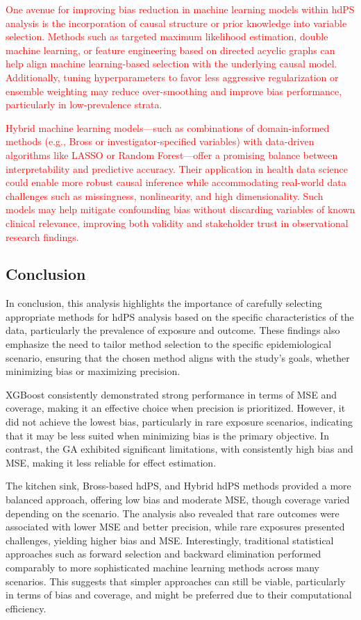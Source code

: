 \documentclass[10pt,letterpaper]{article}
\begin{document}
\textcolor{red}{One avenue for improving bias reduction in machine learning models within hdPS analysis is the incorporation of causal structure or prior knowledge into variable selection. Methods such as targeted maximum likelihood estimation, double machine learning, or feature engineering based on directed acyclic graphs can help align machine learning-based selection with the underlying causal model. Additionally, tuning hyperparameters to favor less aggressive regularization or ensemble weighting may reduce over-smoothing and improve bias performance, particularly in low-prevalence strata.}

\textcolor{red}{Hybrid machine learning models—such as combinations of domain-informed methods (e.g., Bross or investigator-specified variables) with data-driven algorithms like LASSO or Random Forest—offer a promising balance between interpretability and predictive accuracy. Their application in health data science could enable more robust causal inference while accommodating real-world data challenges such as missingness, nonlinearity, and high dimensionality. Such models may help mitigate confounding bias without discarding variables of known clinical relevance, improving both validity and stakeholder trust in observational research findings.}

\subsection{Conclusion}\label{conclusion}

In conclusion, this analysis highlights the importance of carefully
selecting appropriate methods for hdPS analysis based on the specific
characteristics of the data, particularly the prevalence of exposure and
outcome. These findings also emphasize the need to tailor method
selection to the specific epidemiological scenario, ensuring that the
chosen method aligns with the study's goals, whether minimizing bias or
maximizing precision.

XGBoost consistently demonstrated strong performance in terms of MSE and
coverage, making it an effective choice when precision is prioritized.
However, it did not achieve the lowest bias, particularly in rare
exposure scenarios, indicating that it may be less suited when
minimizing bias is the primary objective. In contrast, the GA exhibited
significant limitations, with consistently high bias and MSE, making it
less reliable for effect estimation.

The kitchen sink, Bross-based hdPS, and Hybrid hdPS methods provided a
more balanced approach, offering low bias and moderate MSE, though
coverage varied depending on the scenario. The analysis also revealed
that rare outcomes were associated with lower MSE and better precision,
while rare exposures presented challenges, yielding higher bias and MSE.
Interestingly, traditional statistical approaches such as forward
selection and backward elimination performed comparably to more
sophisticated machine learning methods across many scenarios. This
suggests that simpler approaches can still be viable, particularly in
terms of bias and coverage, and might be preferred due to their
computational efficiency.
\end{document}
